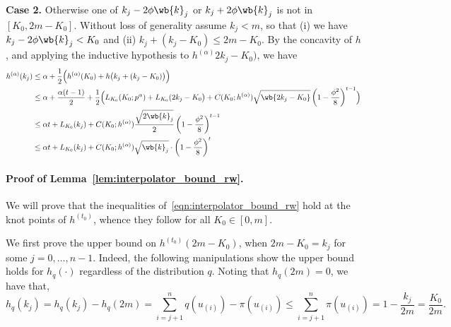 	\textbf{Case 2.} Otherwise one of $k_j - 2 \phi \wb{k}_j$ or $k_j + 2 \phi \wb{k}_j$ is not in $[K_0,2m  - K_0]$. Without loss of generality assume $k_j < m$, so that (i) we have $k_j - 2 \phi \wb{k}_j < K_0$ and (ii) $k_j + (k_j - K_0) \leq 2m - K_0$. By the concavity of $h$, and applying the inductive hypothesis to $h^{(\alpha)}2k_j - K_0)$, we have
	\begin{align*}
	h^{(\alpha)}(k_j) & \leq \alpha + \frac{1}{2}\Bigl(h^{(\alpha)}(K_0) + h\bigl(k_j + (k_j - K_0)\bigr)\Bigr) \\
	& \leq\alpha + \frac{\alpha(t - 1)}{2} + \frac{1}{2}\Bigl(L_{K_0}(K_0;p^{\alpha}) + L_{K_0}(2k_j - K_0\bigr) + C(K_0;h^{(\alpha)})\sqrt{\wb{2k_j - K_0}}\left(1 - \frac{\phi^2}{8}\right)^{t - 1}\Bigr) \\
	& \leq \alpha t + L_{K_0}(k_j) + C(K_0;h^{(\alpha)}) \frac{\sqrt{2\wb{k}_j}}{2} \left(1 - \frac{\phi^2}{8}\right)^{t - 1} \\
	& \leq \alpha t + L_{K_0}(k_j) + C(K_0;h^{(\alpha)}) \sqrt{\wb{k}_j} \cdot \left(1 - \frac{\phi^2}{8}\right)^{t}
	\end{align*}
	
\paragraph{Proof of Lemma~\ref{lem:interpolator_bound_rw}.}
	We will prove that the inequalities of~\eqref{eqn:interpolator_bound_rw} hold at the knot points of $h^{(t_0)}$, whence they follow for all $K_0 \in [0,m]$. 
	
	We first prove the upper bound on $h^{(t_0)}(2m - K_0)$, when $2m - K_0 = k_j$ for some $j = 0,\ldots,n - 1$. Indeed, the following manipulations show the upper bound holds for $h_q(\cdot)$ regardless of the distribution $q$. Noting that $h_q(2m) = 0$, we have that,
	\begin{equation*}
	h_q(k_j) = h_q(k_j) - h_q(2m) = \sum_{i = j + 1}^{n} q(u_{(i)}) - \pi(u_{(i)}) \leq \sum_{i = j + 1}^{n} \pi(u_{(i)}) = 1 - \frac{k_j}{2m} = \frac{K_0}{2m}.
	\end{equation*}
	
